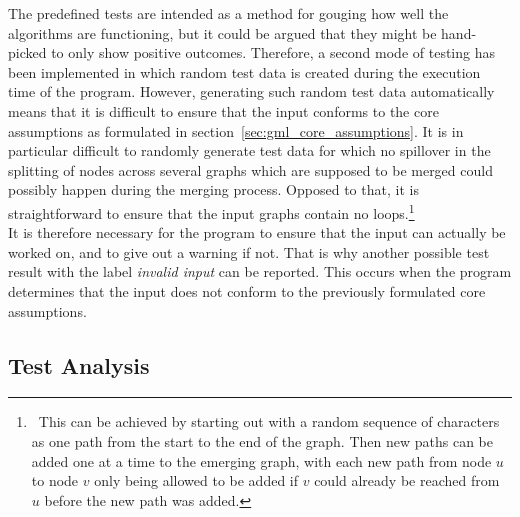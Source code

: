 \documentclass[a4paper,12pt,twoside,BCOR=10mm]{scrbook}
\begin{document}
The predefined tests are intended as a method for gouging how well the algorithms
are functioning, but it could be argued that they might be hand-picked
to only show positive outcomes.
Therefore, a second mode of testing has been implemented
in which random test data is created during the execution time of the program.
However, generating such random test data automatically means
that it is difficult to ensure that the input conforms
to the core assumptions as formulated in section~\ref{sec:gml_core_assumptions}.
It is in particular difficult to randomly generate test data for which
no spillover in the splitting of nodes across several graphs which are
supposed to be merged could possibly happen during the merging process.
Opposed to that, it is straightforward to ensure that the input graphs
contain no loops.\footnote{\,\,\,This can be achieved by starting out with a
random sequence of characters as one path from the start to the end
of the graph.
Then new paths can be added one at a time to the emerging
graph, with each new path from node $ u $ to node $ v $ only being
allowed to be added if $ v $ could already be reached from $ u $ before
the new path was added.} \\
It is therefore necessary for the program to ensure that the
input can actually be worked on, and to give out a warning if not.
That is why another possible test result with the label \textit{invalid input} can be reported.
This occurs when the program determines that the input does not conform
to the previously formulated core assumptions.

\subsection{Test Analysis}
\end{document}
